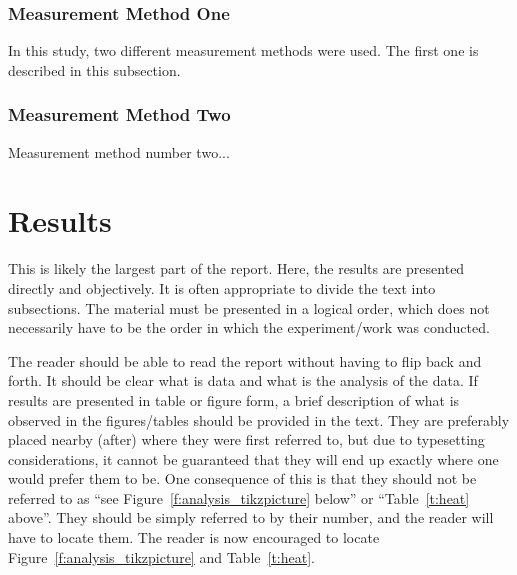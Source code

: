 \documentclass[a4paper]{article}
\begin{document}
\subsubsection{Measurement Method One}
In this study, two different measurement methods were used. The first one is described in this subsection.

\subsubsection{Measurement Method Two}
Measurement method number two...

\newpage
\section{Results}\label{s:results}


This is likely the largest part of the report. Here, the results are presented directly and objectively. It is often appropriate to divide the text into subsections. The material must be presented in a logical order, which does not necessarily have to be the order in which the experiment/work was conducted.

The reader should be able to read the report without having to flip back and forth. It should be clear what is data and what is the analysis of the data. If results are presented in table or figure form, a brief description of what is observed in the figures/tables should be provided in the text. They are preferably placed nearby (after) where they were first referred to, but due to typesetting considerations, it cannot be guaranteed that they will end up exactly where one would prefer them to be. One consequence of this is that they should not be referred to as ``see Figure~\ref{f:analysis_tikzpicture} below'' or ``Table~\ref{t:heat} above''. They should be simply referred to by their number, and the reader will have to locate them. The reader is now encouraged to locate Figure~\ref{f:analysis_tikzpicture} and Table~\ref{t:heat}.
\end{document}
